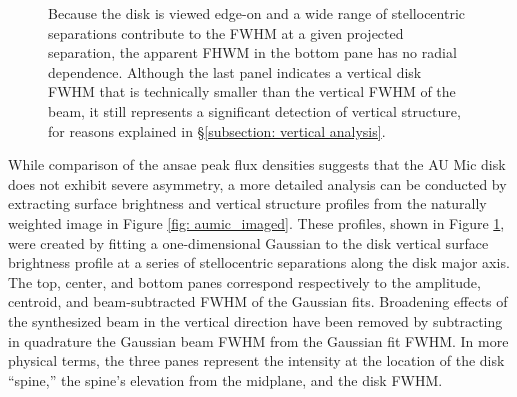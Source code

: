 \documentclass[modern]{aastex62}
\begin{document}
\begin{figure}
{%
Because the disk is viewed edge-on and a wide range of stellocentric separations contribute to the FWHM at a given projected separation, the apparent FHWM in the bottom pane has no radial dependence.
Although the last panel indicates a vertical disk FWHM that is technically smaller than the vertical FWHM of the beam, it still represents a significant detection of vertical structure, for reasons explained in \S \ref{subsection: vertical analysis}.} 
  \label{fig: boccaletti}
\end{figure}

While comparison of the ansae peak flux densities suggests that the AU Mic disk does not exhibit severe asymmetry, a more detailed analysis can be conducted by extracting surface brightness and vertical structure profiles from the naturally weighted image in Figure \ref{fig: aumic_imaged}.
These profiles, shown in Figure \ref{fig: boccaletti}, were created by fitting a one-dimensional Gaussian to the disk vertical surface brightness profile at a series of stellocentric separations along the disk major axis.
The top, center, and bottom panes correspond respectively to the amplitude, centroid, and beam-subtracted FWHM of the Gaussian fits. 
Broadening effects of the synthesized beam in the vertical direction have been removed by subtracting in quadrature the Gaussian beam FWHM from the Gaussian fit FWHM.
In more physical terms, the three panes represent the intensity at the location of the disk ``spine,'' the spine's elevation from the midplane, and the disk FWHM.
\end{document}
